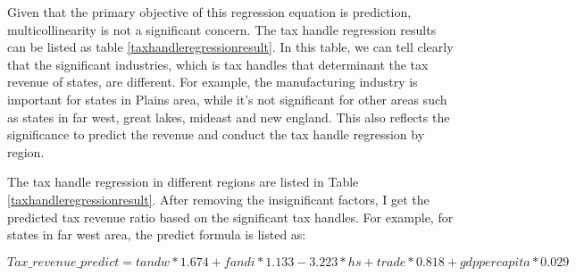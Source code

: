 


Given that the primary objective of this regression equation is prediction, multicollinearity is not a significant concern. The tax handle regression results can be listed as table \ref{taxhandleregressionresult}. In this table, we can tell clearly that the significant industries, which is tax handles that determinant the tax revenue of states, are different. For example, the manufacturing industry is important for states in Plains area, while it's not significant for other areas such as states in far west, great lakes, mideast and new england. This also reflects the significance to predict the revenue and conduct the tax handle regression by region.

The tax handle regression in different regions are listed in Table \ref{taxhandleregressionresult}. After removing the insignificant factors, I get the predicted tax revenue ratio based on the significant tax handles. For example, for states in far west area, the predict formula is listed as:

\begin{equation}
    Tax\_revenue\_predict= tandw* 1.674 + fandi * 1.133 -3.223* hs  + trade * 0.818 + gdppercapita * 0.029 \label{taxhandlefarwest}
\end{equation}



